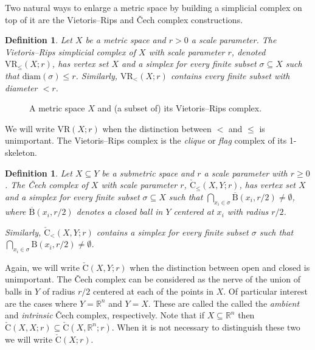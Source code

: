 \documentclass{amsart}
\theoremstyle{plain}
\newtheorem{definition}[lemma]{Definition}
\theoremstyle{definition}
\theoremstyle{myremark}
\newcommand{\R}{\mathbb{R}}
\newcommand{\diam}{\mathrm{diam}}
\newcommand{\ball}[2]{\mathrm{B}(#1,#2)}
\newcommand{\cball}[2]{\overline{\mathrm{B}}(#1,#2)}
\newcommand{\vr}[2]{\mathrm{VR}(#1;#2)}
\newcommand{\vrleq}[2]{\mathrm{VR}_\leq(#1;#2)}
\newcommand{\vrless}[2]{\mathrm{VR}_<(#1;#2)}
\newcommand{\cech}[2]{\mathrm{\check{C}}(#1;#2)}
\newcommand{\cecha}[3]{\mathrm{\check{C}}(#1,#2;#3)}
\newcommand{\cechaleq}[3]{\mathrm{\check{C}_{\le}}(#1,#2;#3)}
\newcommand{\cechaless}[3]{\mathrm{\check{C}_{<}}(#1,#2;#3)}
\begin{document}
Two natural ways to enlarge a metric space by building a simplicial complex on top of it are the Vietoris--Rips and \v{C}ech complex constructions.

\begin{definition}\label{def:VR}
Let $X$ be a metric space and $r>0$ a scale parameter.
The \emph{Vietoris--Rips simplicial complex} of $X$ with scale parameter $r$, denoted $\vrleq{X}{r}$, has vertex set $X$ and a simplex for every finite subset $\sigma \subseteq X$ such that $\diam(\sigma) \leq r$. 
Similarly, $\vrless{X}{r}$ contains every finite subset with diameter $< r$.
\end{definition}

\begin{figure}[h]
\begin{centering}
\def\svgwidth{5in}

\caption{A metric space $X$ and (a subset of) its Vietoris--Rips complex.}
\end{centering}
\end{figure}

We will write $\vr{X}{r}$ when the distinction between $<$ and $\le$ is unimportant.
The Vietoris--Rips complex is the \emph{clique} or \emph{flag} complex of its 1-skeleton.

\begin{definition}\label{def:ambient-cech}
Let $X\subseteq Y$ be a submetric space and $r$ a scale parameter with $r \geq 0$.
The \v{C}ech complex of $X$ with scale parameter $r$, $\cechaleq{X}{Y}{r}$, has vertex set $X$ and a simplex for every finite subset
$\sigma \subseteq X$ such that $\bigcap_{x_i \in \sigma} \cball{x_i}{r/2} \neq \emptyset$,
where $\cball{x_i}{r/2}$ denotes a closed ball in $Y$ centered at $x_i$ with radius $r/2$.

Similarly, $\cechaless{X}{Y}{r}$ contains a simplex for every finite subset $\sigma$ such that 
$\bigcap_{x_i \in \sigma} \ball{x_i}{r/2} \neq \emptyset$.
\end{definition}

Again, we will write $\cecha{X}{Y}{r}$ when the distinction between open and closed is unimportant.
The \v{C}ech complex can be considered as the nerve of the union of balls in $Y$ of radius $r/2$ centered at each of the points in $X$.
Of particular interest are the cases where $Y = \R^n$ and $Y = X$.
These are called the called the \emph{ambient} and \emph{intrinsic} \v{C}ech complex, respectively.
Note that if $X \subseteq\R^n$ then $\cecha{X}{X}{r} \subseteq \cecha{X}{\R^n}{r}$.
When it is not necessary to distinguish these two we will write $\cech{X}{r}$.
\end{document}
